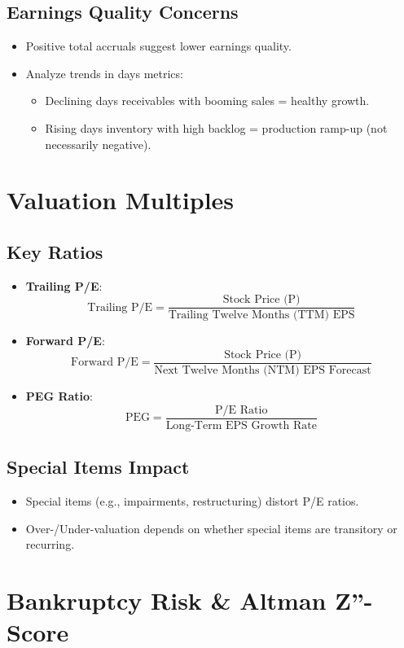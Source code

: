 \documentclass{article}
\begin{document}
\subsection{Earnings Quality Concerns}
\begin{itemize}
    \item Positive total accruals suggest lower earnings quality.
    \item Analyze trends in days metrics:
    \begin{itemize}
        \item Declining days receivables with booming sales = healthy growth.
        \item Rising days inventory with high backlog = production ramp-up (not necessarily negative).
    \end{itemize}
\end{itemize}

\section{Valuation Multiples}
\subsection{Key Ratios}
\begin{itemize}
    \item \textbf{Trailing P/E}:
    \[
    \text{Trailing P/E} = \frac{\text{Stock Price (P)}}{\text{Trailing Twelve Months (TTM) EPS}}
    \]
    \item \textbf{Forward P/E}:
    \[
    \text{Forward P/E} = \frac{\text{Stock Price (P)}}{\text{Next Twelve Months (NTM) EPS Forecast}}
    \]
    \item \textbf{PEG Ratio}:
    \[
    \text{PEG} = \frac{\text{P/E Ratio}}{\text{Long-Term EPS Growth Rate}}
    \]
\end{itemize}

\subsection{Special Items Impact}
\begin{itemize}
    \item Special items (e.g., impairments, restructuring) distort P/E ratios. 
    \item Over-/Under-valuation depends on whether special items are transitory or recurring.
\end{itemize}

\section{Bankruptcy Risk \& Altman Z''-Score}
\end{document}
